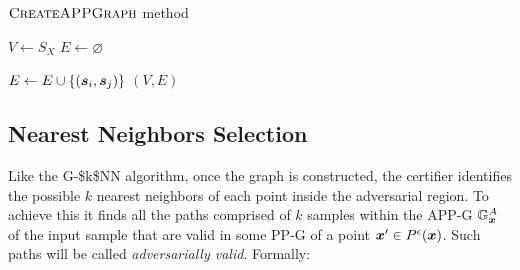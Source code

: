 \begin{algorithm}[H]
	\caption[$\algtitle{CreateAPPGraph}$ method]{$\algtitle{CreateAPPGraph}$ method}
	\label{alg:APP-G-creation}
	\begin{algorithmic}[1]

    \State $V \gets S_X$
    \State $E \gets \varnothing$

        \State $E \gets E \cup \{(\sample[i], \sample[j])\}$
      \EndIf
    \EndFor
		\State \Return $(V, E)$
	\end{algorithmic}
\end{algorithm}

\subsection{Nearest Neighbors Selection}
\label{subsec:valid-path-selection}

Like the \acs{G-$k$NN} algorithm, once the graph is constructed, the certifier identifies the possible $k$ nearest neighbors of each point inside the adversarial region. To achieve this it finds all the paths comprised of $k$ samples within the \acs{APP-G} $\APPG$ of the input sample that are valid in some \acs{PP-G} of a point $\x[]' \in \pert$. Such paths will be called \emph{adversarially valid}. Formally:


